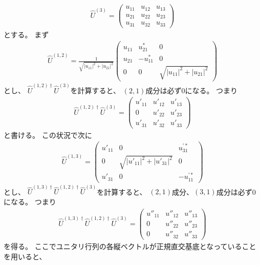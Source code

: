 \documentclass[a4paper, 10pt]{jsarticle}
\begin{document}
\begin{problem}
	\begin{align}
		\hat{U}^{(3)} = \left( \begin{array}{ccc}
			u_{11} & u_{12} & u_{13} \\
			u_{21} & u_{22} & u_{23} \\
			u_{31} & u_{32} & u_{33}
		\end{array} \right)
	\end{align}
	とする。
	まず
	\begin{align}
		\hat{U}^{(1,2)} =
		\frac{1}{\sqrt{|u_{11}|^2 + |u_{21}|^2}} \left( \begin{array}{ccc}
			u_{11} & u_{21}^* & 0 \\
			u_{21} & -u_{11}^* & 0 \\
			0 & 0 & \sqrt{|u_{11}|^2 + |u_{21}|^2}
		\end{array} \right)
	\end{align}
	とし、
	$\hat{U}^{(1,2)\dagger} \hat{U}^{(3)}$を計算すると、
	$(2,1)$成分は必ず0になる。
	つまり
	\begin{align}
		\hat{U}^{(1,2)\dagger} \hat{U}^{(3)} = \left( \begin{array}{ccc}
			u'_{11} & u'_{12} & u'_{13} \\
			0 & u'_{22} & u'_{23} \\
			u'_{31} & u'_{32} & u'_{33}
		\end{array} \right)
	\end{align}
	と書ける。
	この状況で次に
	\begin{align}
		\hat{U}^{(1,3)} = \left( \begin{array}{ccc}
			u'_{11} & 0 & u_{31}^{\prime *} \\
			0 & \sqrt{|u'_{11}|^2 + |u'_{31}|^2} & 0 \\
			u'_{31} & 0 & -u_{11}^{\prime *}
		\end{array} \right)
	\end{align}
	とし、
	$\hat{U}^{(1,3)\dagger} \hat{U}^{(1,2)\dagger} \hat{U}^{(3)}$を計算すると、
	$(2,1)$成分、$(3,1)$成分は必ず0になる。
	つまり
	\begin{align}
		\hat{U}^{(1,3)\dagger} \hat{U}^{(1,2)\dagger} \hat{U}^{(3)}
		= \left( \begin{array}{ccc}
			u''_{11} & u''_{12} & u''_{13} \\
			0 & u''_{22} & u''_{23} \\
			0 & u''_{32} & u''_{33}
		\end{array} \right)
	\end{align}
	を得る。
	ここでユニタリ行列の各縦ベクトルが正規直交基底となっていることを用いると、

\end{problem}
\end{document}
